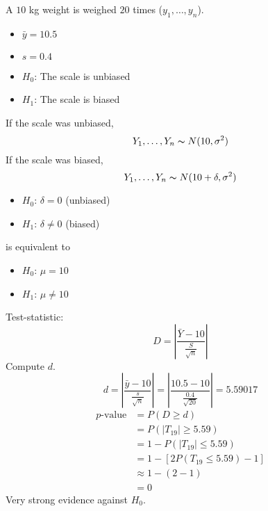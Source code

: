\begin{exbox}
    \begin{example}[Bias]
        A $ 10 $ kg weight is weighed $ 20 $ times ($ y_1,\ldots ,y_n $).
        \begin{itemize}
            \item $ \bar{y}=10.5 $
            \item $ s=0.4 $
            \item $ H_0 $: The scale is unbiased
            \item $ H_1 $: The scale is biased
        \end{itemize}
        If the scale was unbiased,
        \[ Y_1,\ldots ,Y_n \thicksim N(10,\sigma^2) \]
        If the scale was biased,
        \[ Y_1,\ldots ,Y_n \thicksim N(10+\delta,\sigma^2) \]
        \begin{itemize}
            \item $ H_0 $: $ \delta=0 $ (unbiased)
            \item $ H_1 $: $ \delta\neq 0 $ (biased)
        \end{itemize}
        is equivalent to
        \begin{itemize}
            \item $ H_0 $: $ \mu=10 $
            \item $ H_1 $: $ \mu\neq 10 $
        \end{itemize}
        Test-statistic:
        \[ D=\left|\frac{\bar{Y}-10}{\frac{S}{\sqrt{n}}} \right| \]
        Compute $ d $.
        \[ d=
            \left|\frac{\bar{y}-10}{\frac{s}{\sqrt{n}}} \right|=
            \left|\frac{10.5-10}{\frac{0.4}{\sqrt{20}}} \right|=5.59017 \]
        \[
            \begin{aligned}
                p\text{-value}
                 & =P(D\geqslant d)                             \\
                 & =P(|T_{19}|\geqslant 5.59)                   \\
                 & = 1-P(|T_{19}|\leqslant 5.59)                \\
                 & =1-\left[ 2P(T_{19}\leqslant 5.59)-1 \right] \\
                 & \approx 1-(2-1)                              \\
                 & =0
            \end{aligned}
        \]
        Very strong evidence against $ H_0 $.
    \end{example}
\end{exbox}

